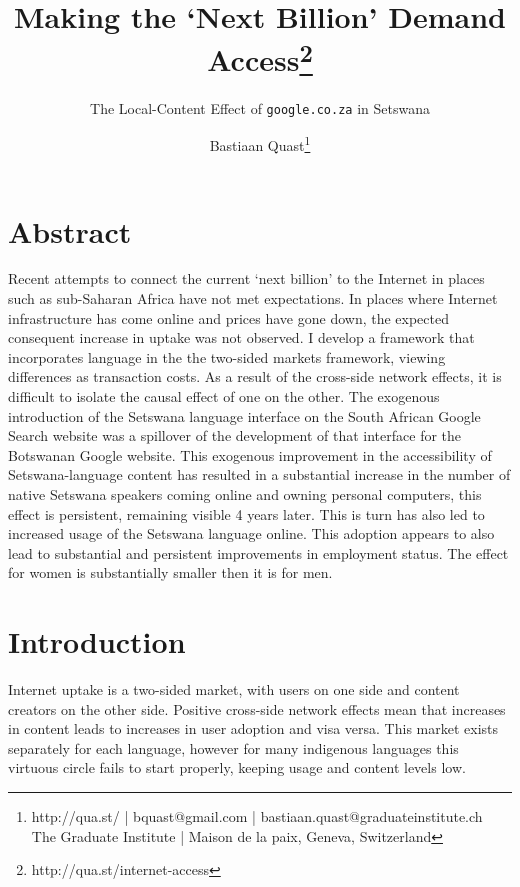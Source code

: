 \documentclass[a4paper,british]{article}\usepackage[]{graphicx}\usepackage[]{color}
\providecommand*{\code}[1]{\texttt{#1}}
\begin{document}
\title{Making the `Next Billion' Demand Access\thanks{http://qua.st/internet-access}}

\author{The Local-Content Effect of \code{google.co.za} in Setswana}

\date{Bastiaan Quast\thanks{http://qua.st/ | bquast@gmail.com | bastiaan.quast@graduateinstitute.ch\protect \\
The Graduate Institute | Maison de la paix, Geneva, Switzerland}}

\maketitle




\section*{Abstract}

Recent attempts to connect the current `next billion' to the Internet
in places such as sub-Saharan Africa have not met expectations. In
places where Internet infrastructure has come online and prices have
gone down, the expected consequent increase in uptake was not observed.
I develop a framework that incorporates language in the the two-sided
markets framework, viewing differences as transaction costs. As a
result of the cross-side network effects, it is difficult to isolate
the causal effect of one on the other. The exogenous introduction
of the Setswana language interface on the South African Google Search
website was a spillover of the development of that interface for the
Botswanan Google website. This exogenous improvement in the accessibility
of Setswana-language content has resulted in a substantial increase
in the number of native Setswana speakers coming online and owning
personal computers, this effect is persistent, remaining visible 4
years later. This is turn has also led to increased usage of the Setswana
language online. This adoption appears to also lead to substantial
and persistent improvements in employment status. The effect for women
is substantially smaller then it is for men. 

\section{Introduction}

\label{sec:intro-1}Internet uptake is a two-sided market, with users
on one side and content creators on the other side. Positive cross-side
network effects mean that increases in content leads to increases
in user adoption and visa versa. This market exists separately for
each language, however for many indigenous languages this virtuous
circle fails to start properly, keeping usage and content levels low. 
\end{document}
